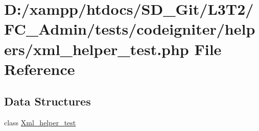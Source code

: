 \hypertarget{xml__helper__test_8php}{}\section{D\+:/xampp/htdocs/\+S\+D\+\_\+\+Git/\+L3\+T2/\+F\+C\+\_\+\+Admin/tests/codeigniter/helpers/xml\+\_\+helper\+\_\+test.php File Reference}
\label{xml__helper__test_8php}
\subsection*{Data Structures}
\begin{DoxyCompactItemize}
\item 
class \hyperlink{class_xml__helper__test}{Xml\+\_\+helper\+\_\+test}
\end{DoxyCompactItemize}
